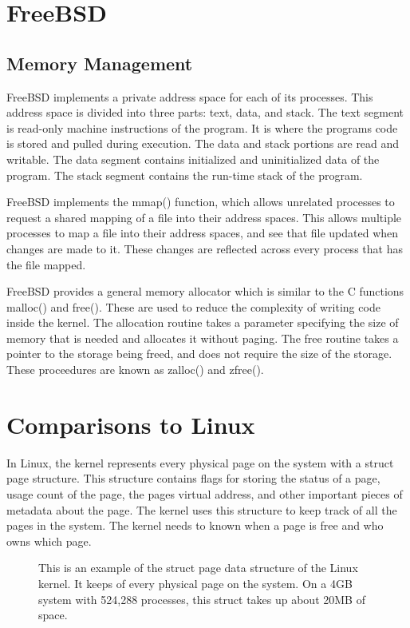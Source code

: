 \documentclass[journal,letterpaper,draftclsnofoot,onecolumn,10pt]{IEEEtran}
\begin{document}
\section{FreeBSD}

\subsection{Memory Management}
FreeBSD implements a private address space for each of its processes. This address space is divided into three parts: text, data, and stack. The text segment is read-only machine instructions of the program. It is where the programs code is stored and pulled during execution. The data and stack portions are read and writable. The data segment contains initialized and uninitialized data of the program. The stack segment contains the run-time stack of the program.\cite{mn15}

FreeBSD implements the mmap() function, which allows unrelated processes to request a shared mapping of a file into their address spaces. This allows multiple processes to map a file into their address spaces, and see that file updated when changes are made to it. These changes are reflected across every process that has the file mapped.\cite{mn15}

FreeBSD provides a general memory allocator which is similar to the C functions malloc() and free(). These are used to reduce the complexity of writing code inside the kernel. The allocation routine takes a parameter specifying the size of memory that is needed and allocates it without paging. The free routine takes a pointer to the storage being freed, and does not require the size of the storage. These proceedures are known as zalloc() and zfree().\cite{mn15}

\section{Comparisons to Linux}

In Linux, the kernel represents every physical page on the system with a struct page structure. This structure contains flags for storing the status of a page, usage count of the page, the pages virtual address, and other important pieces of metadata about the page. The kernel uses this structure to keep track of all the pages in the system. The kernel needs to known when a page is free and who owns which page.\cite{l05}

\begin{figure}[H]
   
   \caption{This is an example of the struct page data structure of the Linux kernel. It keeps of every physical page on the system. On a 4GB system with 524,288 processes, this struct takes up about 20MB of space.}
\end{figure}
\end{document}
